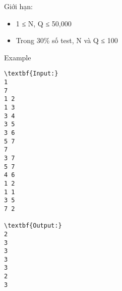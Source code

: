 Giới hạn:
\begin{itemize}
	\item     1 ≤ N, Q ≤ 50,000   
	\item     Trong 30\% số test, N và Q ≤ 100   
\end{itemize}
Example
\begin{verbatim}
\textbf{Input:}
1
7
1 2
1 3
3 4
3 5
3 6
5 7
7
3 7
5 7
4 6
1 2
1 1
3 5
7 2

\textbf{Output:}
2
3
3
3
3
2
3
\end{verbatim}